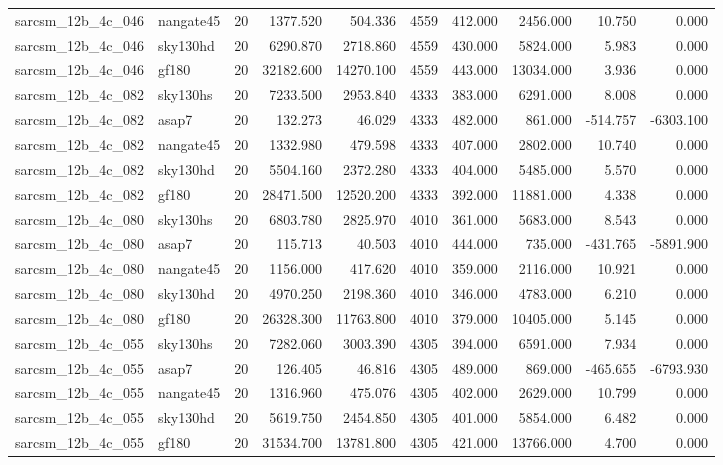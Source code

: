 \begin{longtable}{llrrrrrrrr}
sarcsm\_12b\_4c\_046 & nangate45 & 20 & 1377.520 & 504.336 & 4559 & 412.000 & 2456.000 & 10.750 & 0.000 \\
sarcsm\_12b\_4c\_046 & sky130hd & 20 & 6290.870 & 2718.860 & 4559 & 430.000 & 5824.000 & 5.983 & 0.000 \\
sarcsm\_12b\_4c\_046 & gf180 & 20 & 32182.600 & 14270.100 & 4559 & 443.000 & 13034.000 & 3.936 & 0.000 \\
sarcsm\_12b\_4c\_082 & sky130hs & 20 & 7233.500 & 2953.840 & 4333 & 383.000 & 6291.000 & 8.008 & 0.000 \\
sarcsm\_12b\_4c\_082 & asap7 & 20 & 132.273 & 46.029 & 4333 & 482.000 & 861.000 & -514.757 & -6303.100 \\
sarcsm\_12b\_4c\_082 & nangate45 & 20 & 1332.980 & 479.598 & 4333 & 407.000 & 2802.000 & 10.740 & 0.000 \\
sarcsm\_12b\_4c\_082 & sky130hd & 20 & 5504.160 & 2372.280 & 4333 & 404.000 & 5485.000 & 5.570 & 0.000 \\
sarcsm\_12b\_4c\_082 & gf180 & 20 & 28471.500 & 12520.200 & 4333 & 392.000 & 11881.000 & 4.338 & 0.000 \\
sarcsm\_12b\_4c\_080 & sky130hs & 20 & 6803.780 & 2825.970 & 4010 & 361.000 & 5683.000 & 8.543 & 0.000 \\
sarcsm\_12b\_4c\_080 & asap7 & 20 & 115.713 & 40.503 & 4010 & 444.000 & 735.000 & -431.765 & -5891.900 \\
sarcsm\_12b\_4c\_080 & nangate45 & 20 & 1156.000 & 417.620 & 4010 & 359.000 & 2116.000 & 10.921 & 0.000 \\
sarcsm\_12b\_4c\_080 & sky130hd & 20 & 4970.250 & 2198.360 & 4010 & 346.000 & 4783.000 & 6.210 & 0.000 \\
sarcsm\_12b\_4c\_080 & gf180 & 20 & 26328.300 & 11763.800 & 4010 & 379.000 & 10405.000 & 5.145 & 0.000 \\
sarcsm\_12b\_4c\_055 & sky130hs & 20 & 7282.060 & 3003.390 & 4305 & 394.000 & 6591.000 & 7.934 & 0.000 \\
sarcsm\_12b\_4c\_055 & asap7 & 20 & 126.405 & 46.816 & 4305 & 489.000 & 869.000 & -465.655 & -6793.930 \\
sarcsm\_12b\_4c\_055 & nangate45 & 20 & 1316.960 & 475.076 & 4305 & 402.000 & 2629.000 & 10.799 & 0.000 \\
sarcsm\_12b\_4c\_055 & sky130hd & 20 & 5619.750 & 2454.850 & 4305 & 401.000 & 5854.000 & 6.482 & 0.000 \\
sarcsm\_12b\_4c\_055 & gf180 & 20 & 31534.700 & 13781.800 & 4305 & 421.000 & 13766.000 & 4.700 & 0.000 \\

\end{longtable}
